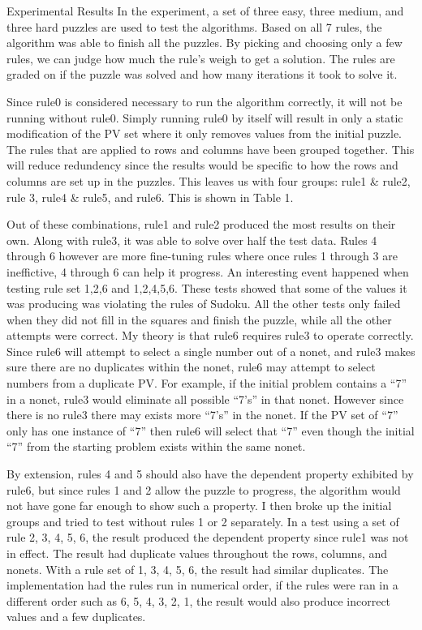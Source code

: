 \documentclass[twocolumn]{article}
\makeatletter
\def\section{\@startsection {section}{1}{\z@}{24pt plus 2pt minus 2pt}
{12pt plus 2pt minus 2pt}{\large\bf}}
\makeatother
\begin{document}
\section{Experimental Results}
In the experiment, a set of three easy, three medium, and three hard puzzles are used to test the algorithms. Based on all 7 rules, the algorithm was able to finish all the puzzles. By picking and choosing only a few rules, we can judge how much the rule’s weigh to get a solution. The rules are graded on if the puzzle was solved and how many iterations it took to solve it.

Since rule0 is considered necessary to run the algorithm correctly, it will not be running without rule0. Simply running rule0 by itself will result in only a static modification of the PV set where it only removes values from the initial puzzle. The rules that are applied to rows and columns have been grouped together. This will reduce redundency since the results would be specific to how the rows and columns are set up in the puzzles. This leaves us with four groups: rule1 \& rule2, rule 3, rule4 \& rule5, and rule6. This is shown in Table 1.

Out of these combinations, rule1 and rule2 produced the most results on their own. Along with rule3, it was able to solve over half the test data. Rules 4 through 6 however are more fine-tuning rules where once rules 1 through 3 are ineffictive, 4 through 6 can help it progress. An interesting event happened when testing rule set 1,2,6 and 1,2,4,5,6. These tests showed that some of the values it was producing was violating the rules of Sudoku. All the other tests only failed when they did not fill in the squares and finish the puzzle, while all the other attempts were correct. My theory is that rule6 requires rule3 to operate correctly. Since rule6 will attempt to select a single number out of a nonet, and rule3 makes sure there are no duplicates within the nonet, rule6 may attempt to select numbers from a duplicate PV. For example, if the initial problem contains a ``7'' in a nonet, rule3 would eliminate all possible ``7’s'' in that nonet. However since there is no rule3 there may exists more ``7’s'' in the nonet. If the PV set of ``7'' only has one instance of ``7'' then rule6 will select that ``7'' even though the initial ``7'' from the starting problem exists within the same nonet.

By extension, rules 4 and 5 should also have the dependent property exhibited by rule6, but since rules 1 and 2 allow the puzzle to progress, the algorithm would not have gone far enough to show such a property. I then broke up the initial groups and tried to test without rules 1 or 2 separately. In a test using a set of rule 2, 3, 4, 5, 6, the result produced the dependent property since rule1 was not in effect. The result had duplicate values throughout the rows, columns, and nonets. With a rule set of  1, 3, 4, 5, 6, the result had similar duplicates. The implementation had the rules run in numerical order, if the rules were ran in a different order such as 6, 5, 4, 3, 2, 1, the result would also produce incorrect values and a few duplicates.
\end{document}
